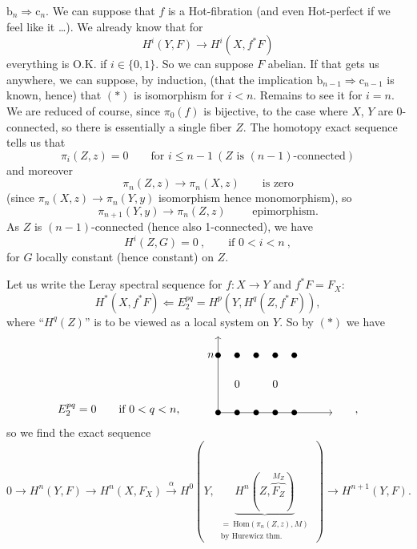 \documentclass[11pt]{article}
\newcommand{\printedpage}[1]{\marginpar{\footnotesize p.~#1}}
\newcommand{\msp}[1]{\marginpar{\footnotesize [#1]}}
\begin{document}
\printedpage{120}

\msp{page 180}
$\mathrm{b}_n \Longrightarrow \mathrm{c}_n$. We can suppose that $f$ is a Hot-fibration (and even Hot-perfect if we feel like it \dots). We already know that for
\[
H^i(Y,F) \longrightarrow H^i(X,f^*F) \tag*{$(*)$}
\]
everything is O.K. if $i \in \{0,1\}$. So we can suppose $F$ abelian. If that gets us anywhere, we can suppose, by induction, (that the implication $\mathrm{b}_{n-1} \Longrightarrow \mathrm{c}_{n-1}$ is known, hence) that $(*)$ is isomorphism for $i<n$. Remains to see it for $i=n$. We are reduced of course, since $\pi_0(f)$ is bijective, to the case where $X$, $Y$ are 0-connected, so there is essentially a single fiber $Z$. The homotopy exact sequence tells us that
\[
\pi_i(Z,z)=0 \qquad \text{for } i \le n-1 \ (Z \text{ is } (n-1)\text{-connected})
\]
and moreover
\[
\pi_n(Z,z) \longrightarrow \pi_n(X,z) \qquad \text{is zero}
\]
(since $\pi_n(X,z) \longrightarrow \pi_n(Y,y)$ isomorphism hence monomorphism), so
\[
\pi_{n+1}(Y,y) \longrightarrow \pi_n(Z,z) \qquad \text{ epimorphism.}
\]
As $Z$ is $(n-1)$-connected (hence also 1-connected), we have
\[
H^i(Z,G)=0\ , \qquad \text{if } 0<i<n\ , \tag*{$(*)$}
\]
for $G$ locally constant (hence constant) on $Z$.

\msp{page 181}
Let us write the Leray spectral sequence for $f : X \longrightarrow Y$ and $f^*F = F_X$:
\[
H^*(X,f^*F) \Longleftarrow E_2^{pq} = H^p(Y,H^q(Z,f^*F)),
\]
where ``$H^q(Z)$'' is to be viewed as a local system on $Y$. So by $(*)$ we have
\[
E_2^{pq}=0 \qquad \text{if } 0<q<n, \qquad
\begin{tikzpicture}[baseline=0pt, x=0.6cm, y=0.6cm]
\draw[->] (0,0) -- (0,4);
\draw[->] (0,0) -- (6,0);
\node[left] at (0,3) {$n$};
\foreach \i in {0,...,4} { \fill (\i,3) circle (2.5pt); \fill (\i,0) circle (2.5pt); }
\node at (1,1.5) {$0$};
\node at (3,1.5) {$0$};
\end{tikzpicture}
\qquad ,
\]
so we find the exact sequence
\[
0 \longrightarrow H^n(Y,F) \longrightarrow H^n(X,F_X) \xrightarrow{\ \alpha\ } H^0(Y,\ \underbrace{H^n(Z,\overbrace{F_Z}^{M_Z})}_{\begin{array}{l}\scriptstyle = \ \mathrm{Hom}(\pi_n(Z,z),M)\\ \scriptstyle \text{by Hurewicz thm.}\end{array}}\ ) \longrightarrow H^{n+1}(Y,F).
\]

\printedpage{121}
\end{document}
